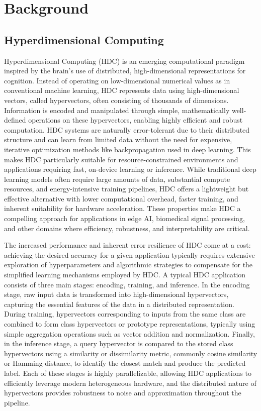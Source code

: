 \vspace{-1em}
\section{Background}

\subsection{Hyperdimensional Computing}

Hyperdimensional Computing (HDC) is an emerging computational paradigm inspired by the brain’s use of distributed, high-dimensional representations for cognition. Instead of operating on low-dimensional numerical values as in conventional machine learning, HDC represents data using high-dimensional vectors, called hypervectors, often consisting of thousands of dimensions. Information is encoded and manipulated through simple, mathematically well-defined operations on these hypervectors, enabling highly efficient and robust computation. HDC systems are naturally error-tolerant due to their distributed structure and can learn from limited data without the need for expensive, iterative optimization methods like backpropagation used in deep learning. This makes HDC particularly suitable for resource-constrained environments and applications requiring fast, on-device learning or inference. While traditional deep learning models often require large amounts of data, substantial compute resources, and energy-intensive training pipelines, HDC offers a lightweight but effective alternative with lower computational overhead, faster training, and inherent suitability for hardware acceleration. These properties make HDC a compelling approach for applications in edge AI, biomedical signal processing, and other domains where efficiency, robustness, and interpretability are critical. 

The increased performance and inherent error resilience of HDC come at a cost: achieving the desired accuracy for a given application typically requires extensive exploration of hyperparameters and algorithmic strategies to compensate for the simplified learning mechanisms employed by HDC.
A typical HDC application consists of three main stages: encoding, training, and inference. In the encoding stage, raw input data is transformed into high-dimensional hypervectors, capturing the essential features of the data in a distributed representation. During training, hypervectors corresponding to inputs from the same class are combined to form class hypervectors or prototype representations, typically using simple aggregation operations such as vector addition and normalization. Finally, in the inference stage, a query hypervector is compared to the stored class hypervectors using a similarity or dissimilarity metric, commonly cosine similarity or Hamming distance, to identify the closest match and produce the predicted label. Each of these stages is highly parallelizable, allowing HDC applications to efficiently leverage modern heterogeneous hardware, and the distributed nature of hypervectors provides robustness to noise and approximation throughout the pipeline.

